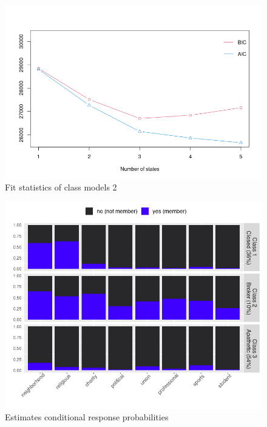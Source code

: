 \begin{figure}[htp]
    \centering
    \includegraphics[width=12cm]{output/plot_fit.png}
    \caption{Fit statistics of class models 2}
    \label{fig:galaxy}
\end{figure}


\begin{figure}[htp]
    \centering
    \includegraphics[width=13cm]{output/plot_latentclass2.png}
    \caption{Estimates conditional response probabilities}
    \label{fig:galaxy}
\end{figure}


